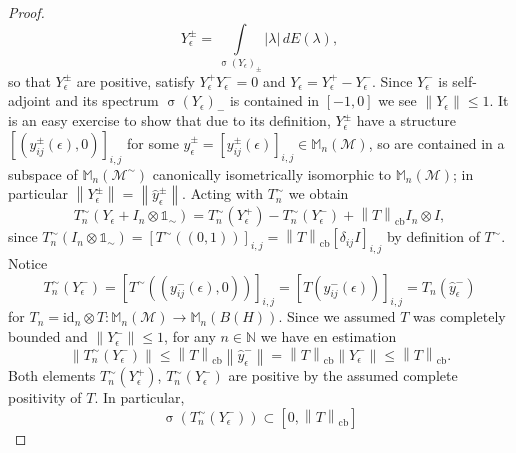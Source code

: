 \documentclass[10pt,a4paper]{amsart}
\newcommand{\cbnorm}[1]{\left\| #1 \right\|_{\mathrm{cb}}}
\newcommand{\id}[1]{\mathrm{id}_{#1}}
\newcommand{\matra}[2]{\mathbb{M}_{#1}(#2)}
\newcommand{\naturals}{\mathbb{N}}
\newcommand{\spec}[1]{\operatorname{\sigma}{\left(#1\right)}}
\newcommand{\unit}{\mathds{1}}
\begin{document}
\begin{proof}
    \begin{equation}
        Y_{\epsilon}^{\pm} = \int\limits_{\spec{Y_\epsilon}_\pm} |\lambda| \, dE(\lambda),
    \end{equation}
    so that $Y_{\epsilon}^{\pm}$ are positive, satisfy $Y_{\epsilon}^{+} Y_{\epsilon}^{-} = 0$ and $Y_\epsilon = Y_{\epsilon}^{+} - Y_{\epsilon}^{-}$. Since $Y_{\epsilon}^{-}$ is self-adjoint and its spectrum $\spec{Y_\epsilon}_-$ is contained in $[-1,0]$ we see $\| Y_\epsilon \| \leqslant 1$. It is an easy exercise to show that due to its definition, $Y_{\epsilon}^{\pm}$ have a structure $\left[(y_{ij}^{\pm}(\epsilon),0)\right]_{i,j}$ for some $\hat{y}_{\epsilon}^{\pm} = \left[y_{ij}^{\pm}(\epsilon)\right]_{i,j}\in \matra{n}{\mathscr{M}}$, so are contained in a subspace of $\matra{n}{\mathscr{M}^\sim}$ canonically isometrically isomorphic to $\matra{n}{\mathscr{M}}$; in particular $\left\|Y_{\epsilon}^{\pm}\right\| = \left\| \hat{y}_{\epsilon}^{\pm} \right\|$. Acting with $T_{n}^{\sim}$ we obtain
    \begin{equation}\label{eq:TnSimOnYplusUnit}
        T_{n}^{\sim}(Y_\epsilon + I_n \otimes \unit_\sim) = T_{n}^{\sim}(Y_{\epsilon}^{+}) - T_{n}^{\sim}(Y_{\epsilon}^{-}) + \cbnorm{T} I_n \otimes I,
    \end{equation}
    since $T_{n}^{\sim}(I_n \otimes \unit_\sim) = \left[ T^\sim ((0,1)) \right]_{i,j} = \cbnorm{T}\left[\delta_{ij}I\right]_{i,j}$ by definition of $T^\sim$. Notice
    \begin{equation}
        T_{n}^{\sim}(Y_{\epsilon}^{-}) = \left[ T^\sim ((y_{ij}^{-}(\epsilon),0)) \right]_{i,j} = \left[T(y_{ij}^{-}(\epsilon))\right]_{i,j} = T_n (\hat{y}^{-}_\epsilon)
    \end{equation}
    for $T_n = \id{n} \otimes T : \matra{n}{\mathscr{M}}\to \matra{n}{B(H)}$. Since we assumed $T$ was completely bounded and $\left\| Y_{\epsilon}^{-}\right\| \leqslant 1$, for any $n\in\naturals$ we have en estimation
    \begin{equation}
        \left\|T_{n}^{\sim}(Y_{\epsilon}^{-}) \right\| \leqslant \cbnorm{T} \left\|\hat{y}^{-}_{\epsilon}\right\| = \cbnorm{T} \left\| Y_{\epsilon}^{-} \right\| \leqslant \cbnorm{T}.
    \end{equation}
    Both elements $T_{n}^{\sim}(Y_{\epsilon}^{+})$, $T_{n}^{\sim}(Y_{\epsilon}^{-})$ are positive by the assumed complete positivity of $T$. In particular,
    \begin{equation}
        \spec{T_{n}^{\sim}(Y_{\epsilon}^{-})} \subset [0, \cbnorm{T}]
    \end{equation}

\end{proof}
\end{document}
